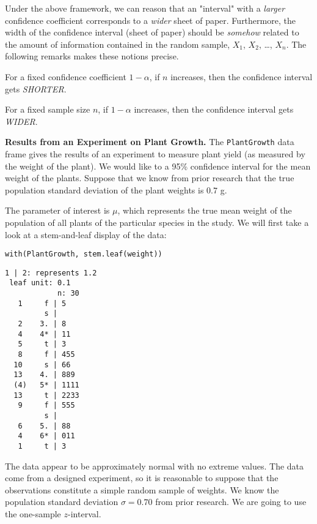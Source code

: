 Under the above framework, we can reason that an "interval" with a
\emph{larger} confidence coefficient corresponds to a \emph{wider} sheet of
paper. Furthermore, the width of the confidence interval (sheet of
paper) should be \emph{somehow} related to the amount of information
contained in the random sample, \(X_{1}\), \(X_{2}\), \ldots{},
\(X_{n}\). The following remarks makes these notions precise.

\begin{rem}
For a fixed confidence coefficient \(1-\alpha\), if \(n\) increases,
then the confidence interval gets \emph{SHORTER}.

For a fixed sample size \(n\), if \(1-\alpha\) increases, then the
confidence interval gets \emph{WIDER}.
\end{rem}

\label{exa-plant-one-samp-z-int} \textbf{Results from an Experiment on Plant
Growth.} The \texttt{PlantGrowth} data frame gives the results of an
experiment to measure plant yield (as measured by the weight of the
plant). We would like to a 95\% confidence interval for the mean weight
of the plants. Suppose that we know from prior research that the true
population standard deviation of the plant weights is \(0.7\) g.

The parameter of interest is \(\mu\), which represents the true mean
weight of the population of all plants of the particular species in
the study. We will first take a look at a stem-and-leaf display of the
data:



\begin{verbatim}
with(PlantGrowth, stem.leaf(weight))
\end{verbatim}

\begin{verbatim}
1 | 2: represents 1.2
 leaf unit: 0.1
            n: 30
   1     f | 5
         s | 
   2    3. | 8
   4    4* | 11
   5     t | 3
   8     f | 455
  10     s | 66
  13    4. | 889
  (4)   5* | 1111
  13     t | 2233
   9     f | 555
         s | 
   6    5. | 88
   4    6* | 011
   1     t | 3
\end{verbatim}

The data appear to be approximately normal with no extreme values. The
data come from a designed experiment, so it is reasonable to suppose
that the observations constitute a simple random sample of
weights. We know the population standard deviation
\(\sigma=0.70\) from prior research. We are going to use the
one-sample \(z\)-interval.

